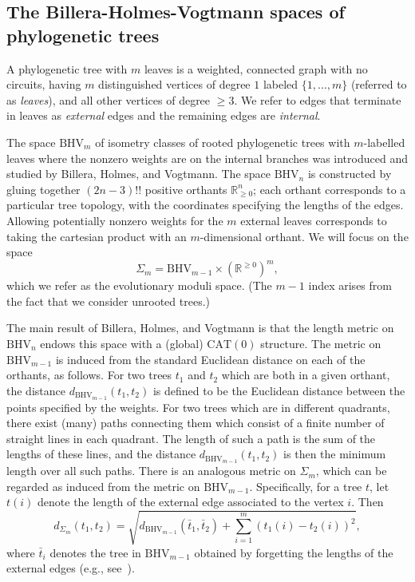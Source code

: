 \documentclass[a4paper,11pt]{article}
\newcommand{\CAT}{\textrm{CAT}}
\newcommand{\BHV}{\textrm{BHV}}
\begin{document}
\subsection{The Billera-Holmes-Vogtmann spaces of phylogenetic trees}

A phylogenetic tree with $m$ leaves is a weighted, connected graph with no circuits, having $m$ distinguished vertices of degree $1$ labeled $\{1, \ldots, m\}$ (referred to as {\em leaves}), and all other vertices of degree $\geq 3$.
We refer to edges that terminate in leaves as {\em external} edges and the remaining edges are {\em internal}.

The space $\BHV_m$ of isometry classes of rooted phylogenetic trees with $m$-labelled leaves where the nonzero weights are on the internal branches was introduced and studied by Billera, Holmes, and Vogtmann.
The space $\BHV_n$ is constructed by gluing together $(2n-3)!!$ positive orthants $\mathbb{R}^n_{\geq 0}$; each orthant corresponds to a particular tree topology, with the coordinates specifying the lengths of the edges.
Allowing potentially nonzero weights for the $m$ external leaves corresponds to taking the cartesian product with an $m$-dimensional orthant.
We will focus on the space 
\[\Sigma_m = \BHV_{m-1} \times (\mathbb{R}^{\geq 0})^{m},\]
which we refer as the evolutionary moduli space.
(The $m-1$ index arises from the fact that we consider unrooted trees.)

The main result of Billera, Holmes, and Vogtmann is that the length metric on $\BHV_n$ endows this space with a (global) $\CAT(0)$ structure.
The metric on $\BHV_{m-1}$ is induced from the standard Euclidean distance on each of the orthants, as follows.
For two trees $t_1$ and $t_2$ which are both in a given orthant, the distance $d_{\BHV_{m-1}}(t_1,t_2)$ is defined to be the Euclidean distance between the points specified by the weights.
For two trees which are in different quadrants, there exist (many) paths connecting them which consist of a finite number of straight lines in each quadrant.
The length of such a path is the sum of the lengths of these lines, and the distance $d_{\BHV_{m-1}}(t_1,t_2)$ is then the minimum length over all such paths.
There is an analogous metric on $\Sigma_m$, which can be regarded as induced from the metric on $\BHV_{m-1}$.
Specifically, for a tree $t$, let $t(i)$ denote the length of the external edge associated to the vertex $i$.
Then \[d_{\Sigma_m}(t_1,t_2) = \sqrt{d_{\BHV_{m-1}}(\bar{t}_1,\bar{t}_2) + \sum_{i=1}^m (t_1(i) - t_2(i))^2},\] where $\bar{t}_i$ denotes the tree in $\BHV_{m-1}$ obtained by forgetting the lengths of the external edges (e.g., see~\cite{owen2011fast}).
\end{document}
